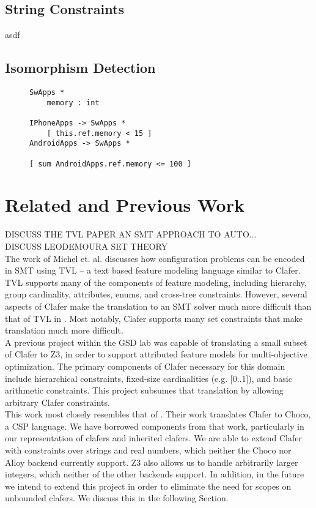 \documentclass{easychair}
\begin{document}
\subsection{String Constraints}
asdf

\subsection{Isomorphism Detection}
\label{isomorphism}
\begin{figure}[!t]
\centering
\begin{lstlisting}[language=clafer, caption=A more complex mobile phone specification in clafer., label={listing:ClaferMoreComplexSpec}, xleftmargin=.2\textwidth, xrightmargin=.2\textwidth]
SwApps *
	memory : int

IPhoneApps -> SwApps *	
	[ this.ref.memory < 15 ]
AndroidApps -> SwApps *

[ sum AndroidApps.ref.memory <= 100 ]	
\end{lstlisting}%
\end{figure}


\section{Related and Previous Work}
DISCUSS THE TVL PAPER AN SMT APPROACH TO AUTO... \\
DISCUSS LEODEMOURA SET THEORY\\
\indent The work of Michel et. al. \cite{Michel2012} discusses how configuration problems can be encoded in SMT using TVL \cite{Classen2011} -- a text based feature modeling language similar to Clafer. TVL supports many of the components of feature modeling, including hierarchy, group cardinality, attributes, enums, and cross-tree constraints. However, several aspects of Clafer make the translation to an SMT solver much more difficult than that of TVL in \cite{Michel2012}. Most notably, Clafer supports many set constraints that make translation much more difficult. \\
\indent  A previous project \cite{Olaechea2013} within the GSD lab was capable of translating a small subset of Clafer to Z3, in order to support attributed feature models for multi-objective optimization. The primary components of Clafer necessary for this domain include hierarchical constraints, fixed-size cardinalities (e.g. [0..1]), and basic arithmetic constraints. This project subsumes that translation by allowing arbitrary Clafer constraints.\\
\indent This work most closely resembles that of \cite{jimmy}. Their work translates Clafer to Choco, a CSP language. We have borrowed components from that work, particularly in our representation of clafers and inherited clafers. We are able to extend Clafer with constraints over strings and real numbers, which neither the Choco nor Alloy backend currently support. Z3 also allows us to handle arbitrarily larger integers, which neither of the other backends support. In addition, in the future we intend to extend this project in order to eliminate the need for scopes on unbounded clafers. We discuss this in the following Section. \\
\end{document}
